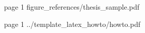 \pdfximage page 1 {figure_references/thesis_sample.pdf}
\immediate{}
\pdfximage page 1 {../template_latex_howto/howto.pdf}
\immediate{}
\bye
